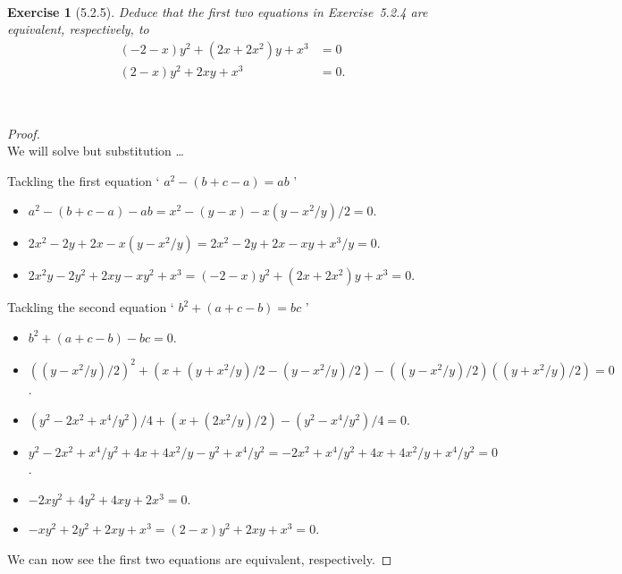 \documentclass[12pt]{article}
\newcommand{\XB}{\color{black}}
\newcommand{\XBB}{\color{blue}}
\newcommand{\ds}{\displaystyle}
\theoremstyle{plain}
\newtheorem{ex}{Exercise}
\begin{document}
\XBB\hrulefill\XB \\
\begin{ex} [5.2.5]
  Deduce that the first two equations in Exercise~5.2.4 are equivalent, respectively, to
  \begin{align*}
    (-2 - x)y^{2} + (2x + 2x^{2})y + x^{3} &= 0 \\
    (2 - x)y^{2} + 2xy + x^{3} &= 0.
  \end{align*}
\end{ex}
\XBB\hrulefill\XB \\

\begin{proof}
  \ \\

  We will solve but substitution \dots

  Tackling the first equation ` $ a^{2} - (b + c - a) = ab $ '

  \begin{itemize}
    \item $ \ds a^{2} - (b + c - a) - ab = x^{2} - (y - x) - x(y - x^{2} / y) / 2 = 0 $.
    \item $ \ds 2x^{2} - 2y + 2x - x(y - x^{2} / y) = 2x^{2} - 2y + 2x - xy + x^{3} / y =  0 $.
    \item $ \ds 2x^{2}y - 2y^{2} + 2xy - xy^{2} + x^{3} = (-2 - x)y^{2} + (2x + 2x^{2})y + x^{3} = 0 $.
  \end{itemize}

  Tackling the second equation ` $ b^{2} + (a + c - b) = bc $ '

  \begin{itemize}
    \item $ \ds b^{2} + (a + c - b) - bc = 0 $.
    \item $ \ds ((y - x^{2} / y) / 2)^{2} + (x + (y + x^{2} / y) / 2 - (y - x^{2} / y) / 2) - ((y - x^{2} / y) / 2)((y + x^{2} / y) / 2) = 0 $.
    \item $ \ds (y^{2} - 2x^{2} + x^{4} / y^{2}) / 4 + (x + (2x^{2} / y) / 2) - (y^{2} - x^{4} / y^{2}) / 4 = 0 $.
    \item $ \ds y^{2} - 2x^{2} + x^{4} / y^{2} + 4x + 4x^{2} / y - y^{2} + x^{4} / y^{2} = - 2x^{2} + x^{4} / y^{2} + 4x + 4x^{2} / y + x^{4} / y^{2} = 0 $.
    \item $ \ds -2xy^{2} + 4y^{2} + 4xy + 2x^{3} = 0 $.
    \item $ \ds -xy^{2} + 2y^{2} + 2xy + x^{3} = (2 - x)y^{2} + 2xy + x^{3} = 0 $.
  \end{itemize}

  We can now see the first two equations are equivalent, respectively.

\end{proof}
\end{document}
